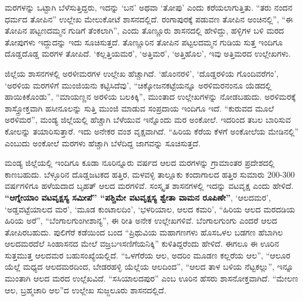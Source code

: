 ಮರಗಳನ್ನು ಒಟ್ಟಾಗಿ ಬೆಳೆಸುತ್ತಿದ್ದರು, ಇದನ್ನು ‘ಬನ’ ಅಥವಾ ‘ತೋಪು’ ಎಂದು ಕರೆಯಲಾಗುತ್ತಿತು. “ತರು ನಂದನ ಧರ್ಮದ ತೋಪಿನ” ಉಲ್ಲೇಖ ಮೇಲುಕೋಟೆ ಶಾಸನದಲ್ಲಿದೆ. ರಂಗಾಪುರಕ್ಕೆ ಪಡುವಣ ತೋಪಿನ ಅಂಚಿನಲ್ಲಿ”, “ಈ ತೋಪಿನ ಪಟ್ಟಣದಮ್ಮನ ಗುಡಿಗೆ ತೆಂಕಲಾಗಿ”, ಎಂದು ತೊಣ್ಣೂರು ಶಾಸನದಲ್ಲಿ ಹೇಳಿದ್ದು, ಹಳ್ಳಿಗಳ ಬಳಿ ಮರದ ತೋಪು\-ಗಳು ಇದ್ದುದನ್ನು ಇದು ಸೂಚಿಸುತ್ತದೆ. ತೊಣ್ಣೂರಿನ ತೋಪಿನ ಪಟ್ಟಲದಮ್ಮನ ಗುಡಿಯ ಸುತ್ತ ಇಂದಿಗೂ ದೊಡ್ಡದೊಡ್ಡ ಮರಗಳ ತೋಪಿದೆ. ‘ಕಲ್ಲತ್ತಿಯಮರ’, ‘ಅತ್ತಿಮರ’, ‘ಅತ್ತಿಹೊಲ’, ಇವು ಅತ್ತಿಮರದ ಉಲ್ಲೇಖಗಳು.

ಜಿಲ್ಲೆಯ ಶಾಸನಗಳಲ್ಲಿ ಅರಳೀಮರಗಳ ಉಲ್ಲೇಖ ಹೆಚ್ಚಾಗಿದೆ. ‘ಹೊಂನರಳಿ’, ‘ದೊಡ್ಡರಳಿಯ ಗೊಂದಿ\-ವರೆಗಂ’, ‘ಅರಳಿಯ ಮರಗಳಿಗೆ ಮುಂಜಿಯನು ಕಟ್ಟಿಸಿದೆವು’, “ಚಿಕ್ಕೋಜನಕಟ್ಟೆಯನ್ನೂ ಅರಳಿಮರನಂನೂ ಯೆಡದಲ್ಲಿ ಹಾಯಿಕಿಕೊಂಡು”, “ಮಾಯಣ್ಣನ ಅರಳಿಯ ಬಲಕಿಕ್ಕಿ”, ಮುಂತಾದ ಉಲ್ಲೇಖಗಳನ್ನು ನೋಡಬಹುದು. ಅರಳಿಮರಕ್ಕೆ ಶಾಸ್ತ್ರೋಕ್ತವಾಗಿ ಹಸೀನೂಲನ್ನು ಸುತ್ತಿ ಮುಂಜಿ ಮಾಡುವ ಸಂಪ್ರದಾಯ ಇಂದಿಗೂ ಇದೆ. “ಕುರುವದ ಮೂಲೆ ಅರಳಿಮರ”, ಮಂಡ್ಯ ಜಿಲ್ಲೆಯಲ್ಲಿ ಹೆಚ್ಚಾಗಿ ಬೆಳೆಯುವ ಇನ್ನೊಂದು ಮರ ಅಂಕೋಲೆ. ಇದರಿಂದ ತಬಲ ಬಾರಿಸುವ ಕೋಲನ್ನು ತಯಾರಿಸು\-ತ್ತಾರೆ. ಇದು ಅನೇಕರ ವಂಶ ವೃಕ್ಷವಾಗಿದೆ. “ಹಿರಿಯ ಕೆರೆಯ ಕೆಳಗೆ ಅಂಕೋಲೆಯ ಮೇಡಿ\-ನಲ್ಲಿ” ಎಂಬುದು ಅಂಕೋಲೆ ಮರ\-ಗಳು ಹೆಚ್ಚಾಗಿ ಬೆಳೆದಿದ್ದ ಜಾಗವನ್ನು ಸೂಚಿಸುತ್ತದೆ.

ಮಂಡ್ಯ ಜಿಲ್ಲೆಯಲ್ಲಿ ಇಂದಿಗೂ ಕೂಡಾ ನೂರಿನ್ನೂರು ವರ್ಷದ ಆಲದ ಮರಗಳನ್ನು ಗ್ರಾಮಾಂತರ ಪ್ರದೇಶದಲ್ಲಿ ಕಾಣಬಹುದು. ಬೆಳ್ಳೂರಿನ ದೊಡ್ಡಜಟಕದ ಹತ್ತಿರ, ಮಳವಳ್ಳಿ ತಾಲ್ಲೂಕು ಕಂದಾಗಾಲದ ಹತ್ತಿರ ಸುಮಾರು 200-300 ವರ್ಷ\-ಗಳಿಗೂ ಹಳೆಯದಾದ ಬೃಹತ್​ ಆಲದ ಮರಗಳಿವೆ. ಸಂಸ್ಕೃತ ಶಾಸನಗಳಲ್ಲಿ ಇದನ್ನು ವಟವೃಕ್ಷ ಎಂದು ಹೇಳಿದೆ. \textbf{“ಆಗ್ನೇಯಾಂ ವಟವೃಕ್ಷಸ್ಯ ಸಮೀಪೆ” “ಪಶ್ಚಿಮೇ ವಟವೃಕ್ಷಸ್ಯ ಶ್ವೇತಾ ವಾಮನ ರೂಪಿಣೇ”}, ‘ಆಲದಮರ’, ‘ಅಡ್ಡವಟ್ಟೆಯಾಲದ ಮರ’, ‘ಮೂಡ ಕುಂಟಾಲದಿಂ’, ‘ಭಳರಿಯಾಲ, ಆಲದ ಕಮರಿ’, “ಹಿರಿಯ ಆಲದ ಮರದಡಿಯ ಹಿರಿಯ ಅರೆ”, “ಬೆಂಗಾಲಗುಂಗೀಶಾನ್ಯ”, ಈ ರೀತಿ ಅನೇಕ ಉಲ್ಲೇಖಗಳಿವೆ. ಬೆಂಗಾಲಗುಂಗು ಎಂದರೆ ಆಲದ ತೋಪಿರಬಹುದು. ಪುಲಿಗೆರೆ ಕಡೆಯಿಂದ ಬಂದ “ಪ್ರಿಥುವಿಯ ಮಹಾಗಣಗಳು ಹೊಸಒಳಲ ಬಡಗಣ ಹೆಬಾಗಿಲ ಆಲದಮರದೆಲೆ ಸಿಂಹಾಸನದ ಮೇಲೆ ವಜ್ರಬಇಸಣಿಗೆಯನಿಕ್ಕಿ” ಕುಳಿತಿದ್ದರೆಂದು ಹೇಳಿದೆ. ಈಗಲೂ ಈ ಊರಿನ ಸುತ್ತಮುತ್ತ ಆಲದಮರ ಬಹುಸಂಖ್ಯೆಯಲ್ಲಿದೆ. “ಒಳಗೆರೆಯ ಆಲ, ಅದರಿಂ ಮೂಡಣ ಕಲ್ಲರೆಯ ಆಲ”, “ಆಲೂರ ಯೆಲ್ಲೆ ಮಧ್ಯದ ಆಲದಮರದಿಂದ, ಬೇಡರಹಳ್ಳಿ ಯೆಲ್ಲೆಯ ಆಲದಿಂದ”, “ಆಲದ ತಾಳ ಬಳಿಯ ನೆಟ್ಟಕಲ್ಲು”, ಇನ್ನೂ ಮುಂತಾಗಿ ಆಲದ ಮರದ ಉಲ್ಲೆಖವಿದೆ. “ಸಸಿಯಾಲದಪುರ” ಎಂಬ ಊರಿನ ಹೆಸರು ಶಾಸನೋಕ್ತವಾಗಿದೆ. “ಮೇಲಣ ಆಲ, ಬ್ರಹ್ಮಚಾರಿ ಆಲ”ದ ಉಲ್ಲೇಖ ಸುಜ್ಜಲೂರು ಶಾಸನದಲ್ಲಿದೆ.

